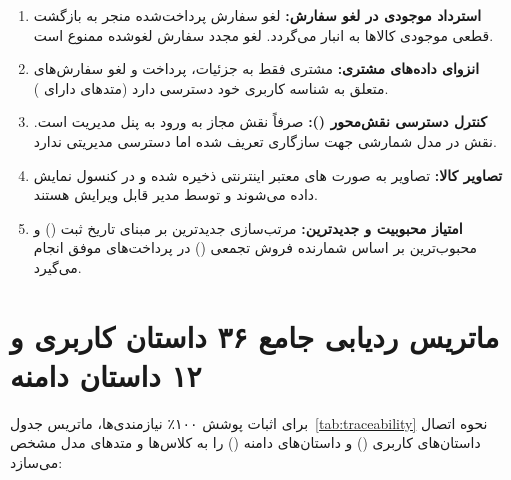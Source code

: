 \documentclass[11pt,a4paper]{article}
\begin{document}
\begin{enumerate}
    \item \textbf{استرداد موجودی در لغو سفارش:} لغو سفارش پرداخت‌شده منجر به بازگشت قطعی موجودی کالاها به انبار می‌گردد. لغو مجدد سفارش لغوشده ممنوع است.
    \item \textbf{انزوای داده‌های مشتری:} مشتری فقط به جزئیات، پرداخت و لغو سفارش‌های متعلق به شناسه کاربری خود دسترسی دارد (متدهای دارای ).
    \item \textbf{کنترل دسترسی نقش‌محور ():} صرفاً نقش  مجاز به ورود به پنل مدیریت است. نقش  در مدل شمارشی جهت سازگاری تعریف شده اما دسترسی مدیریتی ندارد.
    \item \textbf{تصاویر کالا:} تصاویر به صورت های معتبر اینترنتی ذخیره شده و در کنسول نمایش داده می‌شوند و توسط مدیر قابل ویرایش هستند.
    \item \textbf{امتیاز محبوبیت و جدیدترین:} مرتب‌سازی جدیدترین بر مبنای تاریخ ثبت () و محبوب‌ترین بر اساس شمارنده فروش تجمعی () در پرداخت‌های موفق انجام می‌گیرد.
\end{enumerate}

\section{ماتریس ردیابی جامع ۳۶ داستان کاربری و ۱۲ داستان دامنه }

برای اثبات پوشش ۱۰۰٪ نیازمندی‌ها، ماتریس جدول~\ref{tab:traceability} نحوه اتصال داستان‌های کاربری () و داستان‌های دامنه () را به کلاس‌ها و متدهای مدل مشخص می‌سازد:
\end{document}
